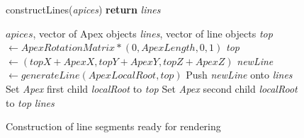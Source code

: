 \documentclass[final]{cmpreport}
\begin{document}
\begin{figure}[ht]
    \begin{algorithm}[H]
    \caption{constructLines(\emph{apices}) {\textbf{return}} \emph{lines}}
        \begin{algorithmic}[1]
        \Require $apices$, vector of Apex objects
        \Ensure \emph{lines}, vector of line objects
            \State \emph{top} $\leftarrow ApexRotationMatrix * (0, ApexLength, 0, 1)$ 
            \State \emph{top} $\leftarrow (topX + ApexX, topY + ApexY, topZ + ApexZ)$ 
            \State \emph{newLine} $\leftarrow generateLine(ApexLocalRoot, top)$ 
            \State Push \emph{newLine} onto \emph{lines}
                \State Set \emph{Apex} first child \emph{localRoot} to \emph{top}
            \EndIf
                \State Set \emph{Apex} second child \emph{localRoot} to \emph{top}
            \EndIf
        \EndFor
        \State \Return \emph{lines}
        \end{algorithmic}
    \end{algorithm}
    \caption{Construction of line segments ready for rendering}
    \label{fig:construct-lines}
\end{figure}



\pagebreak

\end{document}
